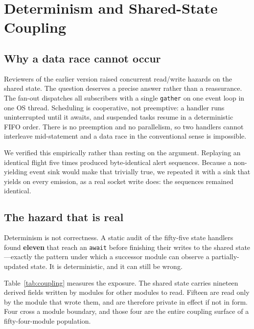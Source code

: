 \documentclass[conference]{IEEEtran}
\begin{document}
\section{Determinism and Shared-State Coupling}
\label{sec:coupling}

\subsection{Why a data race cannot occur}

Reviewers of the earlier version raised concurrent read/write hazards on the
shared state. The question deserves a precise answer rather than a
reassurance. The fan-out dispatches all subscribers with a single
\texttt{gather} on one event loop in one OS thread. Scheduling is cooperative,
not preemptive: a handler runs uninterrupted until it awaits, and suspended
tasks resume in a deterministic FIFO order. There is no preemption and no
parallelism, so two handlers cannot interleave mid-statement and a data race
in the conventional sense is impossible.

We verified this empirically rather than resting on the argument. Replaying an
identical flight five times produced byte-identical alert sequences. Because a
non-yielding event sink would make that trivially true, we repeated it with a
sink that yields on every emission, as a real socket write does: the sequences
remained identical.

\subsection{The hazard that is real}

Determinism is not correctness. A static audit of the fifty-five state
handlers found \textbf{eleven} that reach an \texttt{await} before finishing
their writes to the shared state---exactly the pattern under which a
successor module can observe a partially-updated state. It is deterministic,
and it can still be wrong.

Table~\ref{tab:coupling} measures the exposure. The shared state carries
nineteen derived fields written by modules for other modules to read. Fifteen
are read only by the module that wrote them, and are therefore private in
effect if not in form. Four cross a module boundary, and those four are the
entire coupling surface of a fifty-four-module population.
\end{document}
